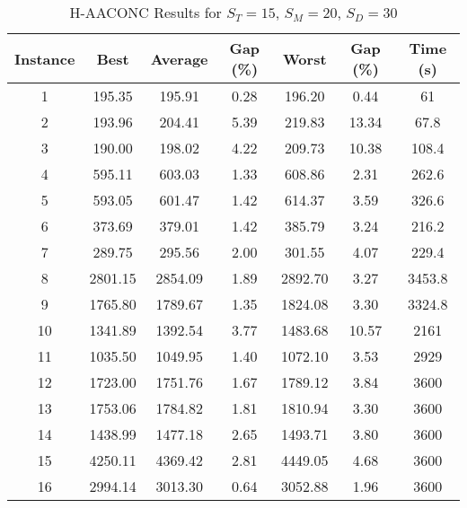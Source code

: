 \begin{table}[h]
	\centering
	\caption{H-AACONC Results for $S_T=15$, $S_M=20$, $S_D=30$}
	\begin{tabular}{@{}ccccccc@{}}
		\midrule
		\textbf{Instance} & \textbf{Best} & \textbf{Average} & \textbf{Gap (\%)} & \textbf{Worst} & \textbf{Gap (\%)} & \textbf{Time (s)} \\ \midrule
		1  & 195.35 & 195.91 & 0.28 & 196.20 & 0.44 & 61   \\ \midrule
		2  & 193.96 & 204.41 & 5.39 & 219.83 & 13.34 & 67.8 \\ \midrule
		3  & 190.00 & 198.02 & 4.22 & 209.73 & 10.38 & 108.4 \\ \midrule
		4  & 595.11 & 603.03 & 1.33 & 608.86 & 2.31 & 262.6 \\ \midrule
		5  & 593.05 & 601.47 & 1.42 & 614.37 & 3.59 & 326.6 \\ \midrule
		6  & 373.69 & 379.01 & 1.42 & 385.79 & 3.24 & 216.2 \\ \midrule
		7  & 289.75 & 295.56 & 2.00 & 301.55 & 4.07 & 229.4 \\ \midrule
		8  & 2801.15 & 2854.09 & 1.89 & 2892.70 & 3.27 & 3453.8 \\ \midrule
		9  & 1765.80 & 1789.67 & 1.35 & 1824.08 & 3.30 & 3324.8 \\ \midrule
		10 & 1341.89 & 1392.54 & 3.77 & 1483.68 & 10.57 & 2161 \\ \midrule
		11 & 1035.50 & 1049.95 & 1.40 & 1072.10 & 3.53 & 2929 \\ \midrule
		12 & 1723.00 & 1751.76 & 1.67 & 1789.12 & 3.84 & 3600 \\ \midrule
		13 & 1753.06 & 1784.82 & 1.81 & 1810.94 & 3.30 & 3600 \\ \midrule
		14 & 1438.99 & 1477.18 & 2.65 & 1493.71 & 3.80 & 3600 \\ \midrule
		15 & 4250.11 & 4369.42 & 2.81 & 4449.05 & 4.68 & 3600 \\ \midrule
		16 & 2994.14 & 3013.30 & 0.64 & 3052.88 & 1.96 & 3600 \\ \midrule
	\end{tabular}
	\label{table:ACO_15-20-30}
\end{table}

